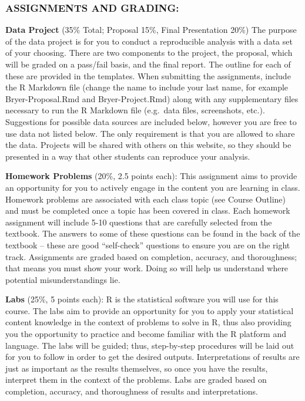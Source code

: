 \documentclass[
  letterpaper,
  DIV=11,
  numbers=noendperiod]{scrartcl}
\begin{document}
\subsubsection{ASSIGNMENTS AND GRADING:}\label{assignments-and-grading}

\textbf{Data Project} (35\% Total; Proposal 15\%, Final Presentation
20\%) The purpose of the data project is for you to conduct a
reproducible analysis with a data set of your choosing. There are two
components to the project, the proposal, which will be graded on a
pass/fail basis, and the final report. The outline for each of these are
provided in the templates. When submitting the assignments, include the
R Markdown file (change the name to include your last name, for example
Bryer-Proposal.Rmd and Bryer-Project.Rmd) along with any supplementary
files necessary to run the R Markdown file (e.g.~data files,
screenshots, etc.). Suggestions for possible data sources are included
below, however you are free to use data not listed below. The only
requirement is that you are allowed to share the data. Projects will be
shared with others on this website, so they should be presented in a way
that other students can reproduce your analysis.

\textbf{Homework Problems} (20\%, 2.5 points each): This assignment aims
to provide an opportunity for you to actively engage in the content you
are learning in class. Homework problems are associated with each class
topic (see Course Outline) and must be completed once a topic has been
covered in class. Each homework assignment will include 5-10 questions
that are carefully selected from the textbook. The answers to some of
these questions can be found in the back of the textbook -- these are
good ``self-check'' questions to ensure you are on the right track.
Assignments are graded based on completion, accuracy, and thoroughness;
that means you must show your work. Doing so will help us understand
where potential misunderstandings lie.

\textbf{Labs} (25\%, 5 points each): R is the statistical software you
will use for this course. The labs aim to provide an opportunity for you
to apply your statistical content knowledge in the context of problems
to solve in R, thus also providing you the opportunity to practice and
become familiar with the R platform and language. The labs will be
guided; thus, step-by-step procedures will be laid out for you to follow
in order to get the desired outputs. Interpretations of results are just
as important as the results themselves, so once you have the results,
interpret them in the context of the problems. Labs are graded based on
completion, accuracy, and thoroughness of results and interpretations.
\end{document}
